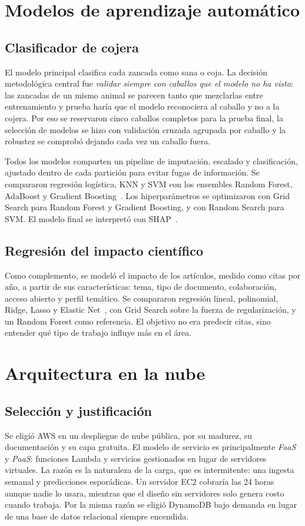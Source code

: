 \documentclass[conference,a4paper]{IEEEtran}
\begin{document}
\section{Modelos de aprendizaje automático}
\subsection{Clasificador de cojera}
El modelo principal clasifica cada zancada como sana o coja. La decisión metodológica central fue \emph{validar siempre con caballos que el modelo no ha visto}: las zancadas de un mismo animal se parecen tanto que mezclarlas entre entrenamiento y prueba haría que el modelo reconociera al caballo y no a la cojera. Por eso se reservaron cinco caballos completos para la prueba final, la selección de modelos se hizo con validación cruzada agrupada por caballo y la robustez se comprobó dejando cada vez un caballo fuera.

Todos los modelos comparten un pipeline de imputación, escalado y clasificación, ajustado dentro de cada partición para evitar fugas de información. Se compararon regresión logística, KNN y SVM con los ensembles Random Forest, AdaBoost y Gradient Boosting~\cite{breiman2001}. Los hiperparámetros se optimizaron con Grid Search para Random Forest y Gradient Boosting, y con Random Search para SVM. El modelo final se interpretó con SHAP~\cite{lundberg2017}.

\subsection{Regresión del impacto científico}
Como complemento, se modeló el impacto de los artículos, medido como citas por año, a partir de sus características: tema, tipo de documento, colaboración, acceso abierto y perfil temático. Se compararon regresión lineal, polinomial, Ridge, Lasso y Elastic Net~\cite{tibshirani1996,zou2005}, con Grid Search sobre la fuerza de regularización, y un Random Forest como referencia. El objetivo no era predecir citas, sino entender qué tipo de trabajo influye más en el área.

\section{Arquitectura en la nube}
\subsection{Selección y justificación}
Se eligió AWS en un despliegue de nube pública, por su madurez, su documentación y su capa gratuita. El modelo de servicio es principalmente \emph{FaaS} y \emph{PaaS}: funciones Lambda y servicios gestionados en lugar de servidores virtuales. La razón es la naturaleza de la carga, que es intermitente: una ingesta semanal y predicciones esporádicas. Un servidor EC2 cobraría las 24 horas aunque nadie lo usara, mientras que el diseño sin servidores solo genera costo cuando trabaja. Por la misma razón se eligió DynamoDB bajo demanda en lugar de una base de datos relacional siempre encendida.
\end{document}
